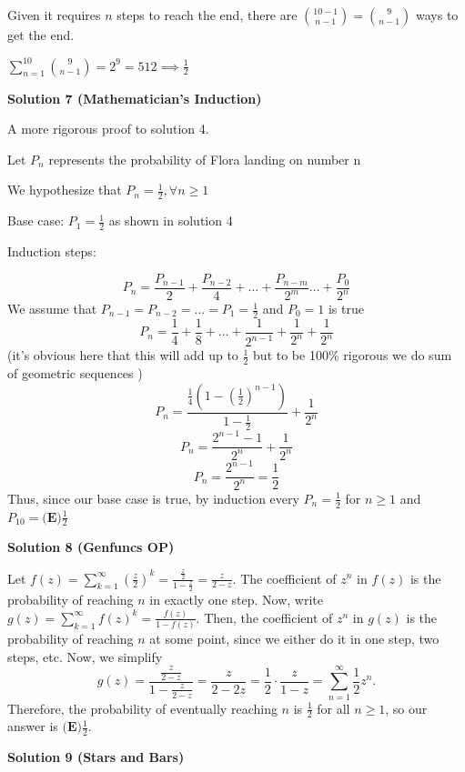 \begin{enumerate}
 Given it requires $n$ steps to reach the end, there are $\binom{10-1}{n-1}=\binom{9}{n-1}$ ways to get the end.

 $\sum_{n=1}^{10}\binom{9}{n-1}=2^9=512\implies \frac{1}{2}$




\textbf{Solution 7 (Mathematician's Induction)}

A more rigorous proof to solution 4.

 Let $P_n$ represents the probability of Flora landing on number n 

 We hypothesize that $P_n = \frac{1}{2}, \forall n \ge 1$ 

 Base case: $P_1 = \frac{1}{2}$ as shown in solution 4 

 Induction steps: 

 
 \[P_n = \frac{P_{n-1}}{2} + \frac{P_{n-2}}{4} + \dots + \frac{P_{n-m}}{2^m} \dots + \frac{P_0}{2^n}\]We assume that $P_{n-1} = P_{n-2} = \dots = P_1 = \frac{1}{2}$ and $P_0 = 1$ is true
 \[P_n = \frac{1}{4} + \frac{1}{8} + \dots + \frac{1}{2^{n-1}} + \frac{1}{2^n} + \frac{1}{2^n}\] (it's obvious here that this will add up to $\frac{1}{2}$ but to be 100\% rigorous we do sum of geometric sequences )
 \[P_n = \frac{\frac{1}{4}(1 - (\frac{1}{2})^{n-1})}{1 - \frac{1}{2}} + \frac{1}{2^n}\]
 \[P_n = \frac{2^{n-1} - 1}{2^n} + \frac{1}{2^n}\]
 \[P_n = \frac{2^{n-1}}{2^n} = \frac{1}{2}\]Thus, since our base case is true, by induction every $P_n = \frac{1}{2}$ for $n \ge 1$ and $P_{10} = \boxed{\textbf{(E)} \frac{1}{2}}$




\textbf{Solution 8 (Genfuncs OP)}

Let $f(z)=\sum\limits_{k=1}^{\infty}\left(\frac{z}{2}\right)^{k}=\frac{\frac{z}{2}}{1-\frac{z}{2}}=\frac{z}{2-z}$. The coefficient of $z^{n}$ in $f(z)$ is the probability of reaching $n$ in exactly one step. Now, write $g(z)=\sum\limits_{k=1}^{\infty}f(z)^{k}=\frac{f(z)}{1-f(z)}$. Then, the coefficient of $z^{n}$ in $g(z)$ is the probability of reaching $n$ at some point, since we either do it in one step, two steps, etc. Now, we simplify 
 \[g(z)=\frac{\frac{z}{2-z}}{1-\frac{z}{2-z}}=\frac{z}{2-2z}=\frac{1}{2} \cdot \frac{z}{1-z}=\sum\limits_{n=1}^{\infty}\frac{1}{2}z^{n}.\] Therefore, the probability of eventually reaching $n$ is $\frac{1}{2}$ for all $n\geq1$, so our answer is $\boxed{\textbf{(E)}\frac{1}{2}}$.

 



\textbf{Solution 9 (Stars and Bars)}


\end{enumerate}
